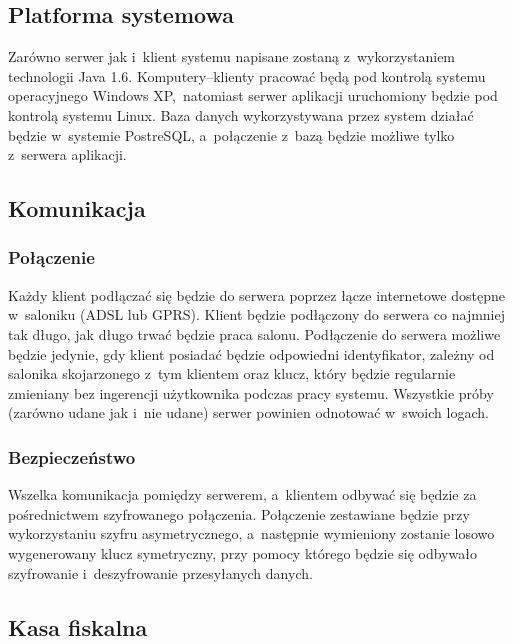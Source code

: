\subsection{Platforma systemowa}
Zarówno serwer jak i~klient systemu napisane zostaną z~wykorzystaniem technologii Java 1.6. Komputery--klienty pracować będą pod kontrolą systemu operacyjnego Windows XP\texttrademark ,~natomiast serwer aplikacji uruchomiony będzie pod kontrolą systemu Linux. Baza danych wykorzystywana przez system działać będzie w~systemie PostreSQL, a~połączenie z~bazą będzie możliwe tylko z~serwera aplikacji.
\subsection{Komunikacja}
\subsubsection{Połączenie}
Każdy klient podłączać się będzie do serwera poprzez łącze internetowe dostępne w~saloniku (ADSL lub GPRS). Klient będzie podłączony do serwera co najmniej tak długo, jak długo trwać będzie praca salonu. Podłączenie do serwera możliwe będzie jedynie, gdy klient posiadać będzie odpowiedni identyfikator, zależny od salonika skojarzonego z~tym klientem oraz klucz, który będzie regularnie zmieniany bez ingerencji użytkownika podczas pracy systemu. Wszystkie próby (zarówno udane jak i~nie udane) serwer powinien odnotować w~swoich logach.
\subsubsection{Bezpieczeństwo}
Wszelka komunikacja pomiędzy serwerem, a~klientem odbywać się będzie za pośrednictwem szyfrowanego połączenia. Połączenie zestawiane będzie przy wykorzystaniu szyfru asymetrycznego, a~następnie wymieniony zostanie losowo wygenerowany klucz symetryczny, przy pomocy którego będzie się odbywało szyfrowanie i~deszyfrowanie przesyłanych danych.
\subsection{Kasa fiskalna}

